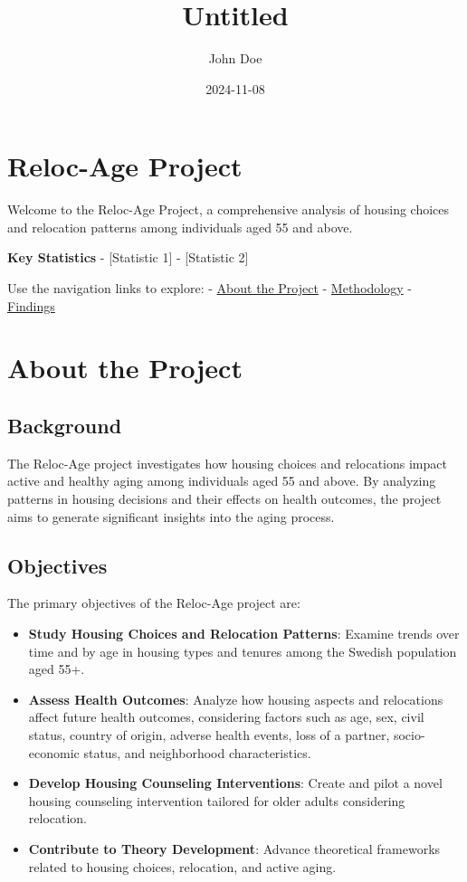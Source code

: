 \documentclass[
]{book}
\title{Untitled}
\author{John Doe}
\date{2024-11-08}
\begin{document}
\maketitle

{
\setcounter{tocdepth}{1}
\tableofcontents
}
\hypertarget{reloc-age-project}{%
\chapter{Reloc-Age Project}\label{reloc-age-project}}

Welcome to the Reloc-Age Project, a comprehensive analysis of housing choices and relocation patterns among individuals aged 55 and above.

\textbf{Key Statistics}
- {[}Statistic 1{]}
- {[}Statistic 2{]}

Use the navigation links to explore:
- \href{about.html}{About the Project}
- \href{methodology.html}{Methodology}
- \href{findings.html}{Findings}

\hypertarget{about-the-project}{%
\chapter{About the Project}\label{about-the-project}}

\hypertarget{background}{%
\section{Background}\label{background}}

The Reloc-Age project investigates how housing choices and relocations impact active and healthy aging among individuals aged 55 and above. By analyzing patterns in housing decisions and their effects on health outcomes, the project aims to generate significant insights into the aging process.

\hypertarget{objectives}{%
\section{Objectives}\label{objectives}}

The primary objectives of the Reloc-Age project are:

\begin{itemize}
\item
  \textbf{Study Housing Choices and Relocation Patterns}: Examine trends over time and by age in housing types and tenures among the Swedish population aged 55+.
\item
  \textbf{Assess Health Outcomes}: Analyze how housing aspects and relocations affect future health outcomes, considering factors such as age, sex, civil status, country of origin, adverse health events, loss of a partner, socio-economic status, and neighborhood characteristics.
\item
  \textbf{Develop Housing Counseling Interventions}: Create and pilot a novel housing counseling intervention tailored for older adults considering relocation.
\item
  \textbf{Contribute to Theory Development}: Advance theoretical frameworks related to housing choices, relocation, and active aging.
\end{itemize}
\end{document}

